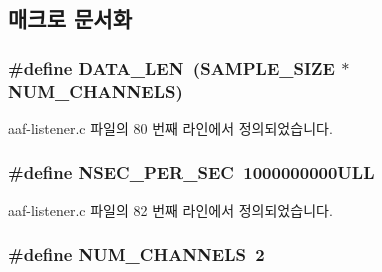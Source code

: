 \subsection{매크로 문서화}
\subsubsection[{\texorpdfstring{D\+A\+T\+A\+\_\+\+L\+EN}{DATA_LEN}}]{\setlength{\rightskip}{0pt plus 5cm}\#define D\+A\+T\+A\+\_\+\+L\+EN~({\bf S\+A\+M\+P\+L\+E\+\_\+\+S\+I\+ZE} $\ast$ {\bf N\+U\+M\+\_\+\+C\+H\+A\+N\+N\+E\+LS})}\hypertarget{aaf-listener_8c_af02e45f15080b8ec9dd7b286157617ff}{}\label{aaf-listener_8c_af02e45f15080b8ec9dd7b286157617ff}


aaf-\/listener.\+c 파일의 80 번째 라인에서 정의되었습니다.

\subsubsection[{\texorpdfstring{N\+S\+E\+C\+\_\+\+P\+E\+R\+\_\+\+S\+EC}{NSEC_PER_SEC}}]{\setlength{\rightskip}{0pt plus 5cm}\#define N\+S\+E\+C\+\_\+\+P\+E\+R\+\_\+\+S\+EC~1000000000\+U\+LL}\hypertarget{aaf-listener_8c_a0501e82515b2bdf36453c4cc80f5e0cc}{}\label{aaf-listener_8c_a0501e82515b2bdf36453c4cc80f5e0cc}


aaf-\/listener.\+c 파일의 82 번째 라인에서 정의되었습니다.

\subsubsection[{\texorpdfstring{N\+U\+M\+\_\+\+C\+H\+A\+N\+N\+E\+LS}{NUM_CHANNELS}}]{\setlength{\rightskip}{0pt plus 5cm}\#define N\+U\+M\+\_\+\+C\+H\+A\+N\+N\+E\+LS~2}\hypertarget{aaf-listener_8c_ae5597ce31d23d11493e6e674fe257d73}{}\label{aaf-listener_8c_ae5597ce31d23d11493e6e674fe257d73}



